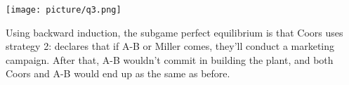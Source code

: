 \documentclass[a4paper]{article}
\begin{document}
\begin{answer}[problem]
    \begin{minipage}[t]{\textwidth}
        \centering
        \texttt{[image: picture/q3.png]}
    \end{minipage}
    Using backward induction, the subgame perfect equilibrium is that Coors uses strategy 2: declares that if A-B or Miller comes, they'll conduct a marketing campaign. After that, A-B wouldn't commit in building the plant, and both Coors and A-B would end up as the same as before.
    
    \end{answer}
    
\end{document}
